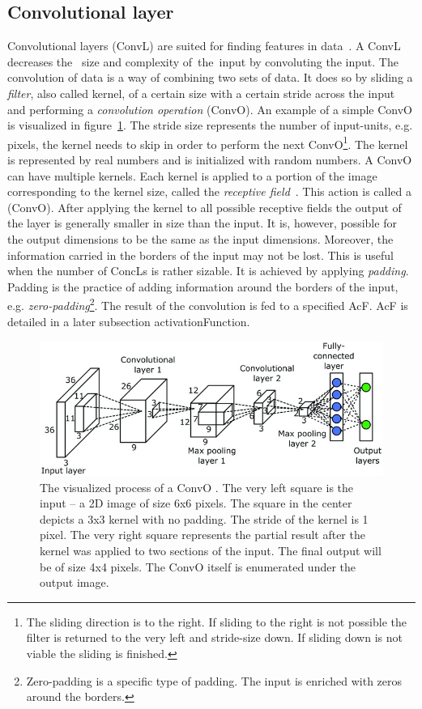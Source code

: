 \subsection{Convolutional layer}\label{convolutionalLayers}
Convolutional layers (ConvL) are suited for finding features in data~\cite{CNN}. A ConvL decreases the~ size and complexity of~the~input by convoluting the input. The convolution of data is a way of combining two sets of data.  It does so by sliding a \textit{filter}, also called kernel, of a certain size with a certain stride across the input and performing a \textit{convolution operation} (ConvO). An example of a simple ConvO is visualized in figure~\ref{convolutionalLayerVisualization}. The stride size represents the number of input-units, e.g. pixels, the kernel needs to skip in order to perform the next ConvO\footnote{The sliding direction is to the right. If sliding to the right is not possible the filter is returned to the very left and stride-size down. If sliding down is not viable the sliding is finished.}. The kernel is represented by real numbers and is initialized with random numbers. A ConvO can have multiple kernels. Each kernel is applied to a portion of the image corresponding to the kernel size, called the \textit{receptive field}~\cite{receptiveField}. This action is called a (ConvO). After applying the kernel to all possible receptive fields the output of the layer is generally smaller in size than the input. It is, however, possible for the output dimensions to be the same as the input dimensions. Moreover, the information carried in the borders of the input may not be lost. This is useful when the number of ConcLs is rather sizable. It is achieved by applying \textit{padding}. Padding is the practice of adding information around the borders of the input, e.g. \textit{zero-padding}\footnote{Zero-padding is a specific type of padding. The input is enriched with zeros around the borders.}. The result of the convolution is fed to a specified AcF. AcF is detailed in a later subsection {activationFunction}.
\begin{figure}[ht!]
  \centering
  \includegraphics[width=\textwidth]{Images/StructureOfCNN.png}
  \caption{The visualized process of a ConvO \cite{convolutionOperationVisualization}. The very left square is the input -- a 2D image of size 6x6 pixels. The square in the center depicts a 3x3 kernel with no padding. The stride of the kernel is 1 pixel. The very right square represents the partial result after the kernel was applied to two sections of the input. The final output will be of size 4x4 pixels. The ConvO itself is enumerated under the output image.} 
  \label{convolutionalLayerVisualization}
\end{figure} 

